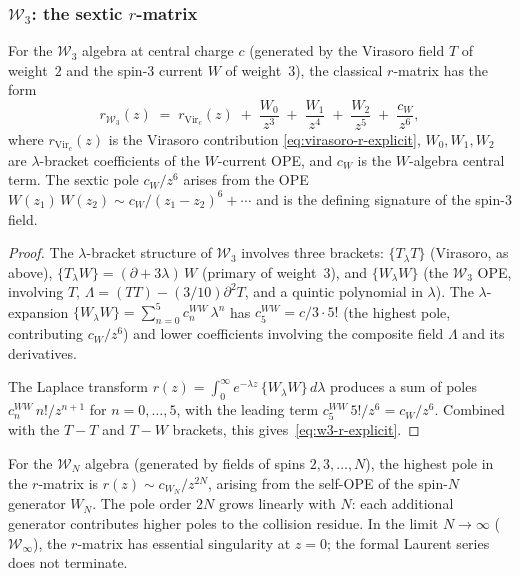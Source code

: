 \subsubsection{$\mathcal{W}_3$: the sextic $r$-matrix}

\begin{proposition}
For the $\mathcal{W}_3$ algebra at central charge $c$
(generated by the Virasoro field $T$ of weight~$2$ and the
spin-$3$ current $W$ of weight~$3$), the classical $r$-matrix
has the form
\begin{equation}
r_{\mathcal{W}_3}(z)
\;=\;
r_{\mathrm{Vir}_c}(z)
\;+\;
\frac{W_0}{z^3}
\;+\;
\frac{W_1}{z^4}
\;+\;
\frac{W_2}{z^5}
\;+\;
\frac{c_W}{z^6},
\end{equation}
where $r_{\mathrm{Vir}_c}(z)$ is the Virasoro contribution
\eqref{eq:virasoro-r-explicit}, $W_0, W_1, W_2$ are
$\lambda$-bracket coefficients of the $W$-current OPE, and
$c_W$ is the $W$-algebra central term. The sextic pole
$c_W/z^6$ arises from the OPE $W(z_1)\, W(z_2) \sim
c_W/(z_1 - z_2)^6 + \cdots$ and is the defining signature
of the spin-$3$ field.
\end{proposition}

\begin{proof}
The $\lambda$-bracket structure of $\mathcal{W}_3$ involves three
brackets: $\{T {}_\lambda T\}$ (Virasoro, as above),
$\{T {}_\lambda W\} = (\partial + 3\lambda)\, W$ (primary of
weight~$3$), and $\{W {}_\lambda W\}$ (the $\mathcal{W}_3$ OPE,
involving $T$, $\Lambda = (TT) - (3/10)\partial^2 T$, and a
quintic polynomial in $\lambda$). The $\lambda$-expansion
$\{W {}_\lambda W\} = \sum_{n=0}^{5} c_n^{WW}\, \lambda^n$
has $c_5^{WW} = c/3\cdot5!$ (the highest pole, contributing
$c_W/z^6$) and lower coefficients involving the composite field
$\Lambda$ and its derivatives.

The Laplace transform $r(z) = \int_0^\infty e^{-\lambda z}\,
\{W {}_\lambda W\}\, d\lambda$ produces a sum of poles
$c_n^{WW}\, n!/z^{n+1}$ for $n = 0, \ldots, 5$, with the
leading term $c_5^{WW}\, 5!/z^6 = c_W/z^6$. Combined with the
$T{-}T$ and $T{-}W$ brackets, this gives~\eqref{eq:w3-r-explicit}.
\end{proof}

\begin{remark}
For the $\mathcal{W}_N$ algebra (generated by fields of spins
$2, 3, \ldots, N$), the highest pole in the $r$-matrix is
$r(z) \sim c_{W_N}/z^{2N}$, arising from the self-OPE of the
spin-$N$ generator $W_N$. The pole order $2N$ grows linearly
with $N$: each additional generator contributes higher poles to
the collision residue. In the limit $N \to \infty$
($\mathcal{W}_\infty$), the $r$-matrix has essential singularity
at $z = 0$; the formal Laurent series does not terminate.
\end{remark}

